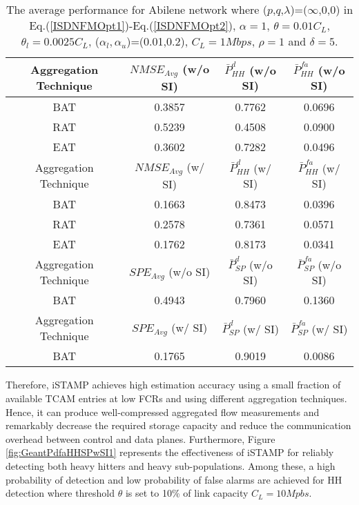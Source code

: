 \begin{table}
	\centering
 \scriptsize{
 \renewcommand{\tabcolsep}{0.05cm}
 \renewcommand{\arraystretch}{1.0}
		\begin{tabular}{| c | c | c | c |}
		\hline
     Aggregation Technique  & $NMSE_{Avg}$ (w/o SI) & $\bar{P}_{HH}^{d}$ (w/o SI) & $\bar{P}_{HH}^{fa}$ (w/o SI) \\ \hline
    \hline
      BAT &  0.3857  &  0.7762  &  0.0696  \\ \hline
      RAT &  0.5239  &  0.4508  &  0.0900  \\ \hline
      EAT &  0.3602  &  0.7282  &  0.0496  \\ \hline
		\hline
     Aggregation Technique  & $NMSE_{Avg}$ (w/ SI) & $\bar{P}_{HH}^{d}$ (w/ SI) &  $\bar{P}_{HH}^{fa}$ (w/ SI) \\ \hline
    \hline
      BAT &  0.1663 &  0.8473  &  0.0396   \\ \hline
      RAT &  0.2578 &  0.7361  &  0.0571   \\ \hline
      EAT &  0.1762 &  0.8173  &  0.0341   \\ \hline
		\hline
     Aggregation Technique  & $SPE_{Avg}$ (w/o SI) & $\bar{P}_{SP}^{d}$ (w/o SI) & $\bar{P}_{SP}^{fa}$ (w/o SI) \\ \hline
    \hline
      BAT &  0.4943  &  0.7960  &  0.1360  \\ \hline
		\hline
     Aggregation Technique  & $SPE_{Avg}$ (w/ SI) & $\bar{P}_{SP}^{d}$ (w/ SI) &  $\bar{P}_{SP}^{fa}$ (w/ SI) \\ \hline
    \hline
      BAT &  0.1765 &   0.9019  &  0.0086   \\ \hline
    \end{tabular}
	\caption{\footnotesize{The average performance for Abilene network where ($p$,$q$,$\lambda$)=($\infty$,0,0) in Eq.(\ref{ISDNFMOpt1})-Eq.(\ref{ISDNFMOpt2}), $\alpha=1$, $\theta=0.01C_{L}$, $\theta_{l}=0.0025C_{L}$, ($\alpha_{l},\alpha_{u}$)=(0.01,0.2), $C_{L}=1 Mbps$, $\rho=1$ and $\delta=5$.}}
	\label{tab:AvgPerfAbilene}
}
\end{table}

Therefore, iSTAMP achieves high estimation accuracy using a small fraction of available TCAM entries at low FCRs and using different aggregation techniques. Hence, it can produce well-compressed aggregated flow measurements and remarkably decrease the required storage capacity and reduce the communication overhead between control and data planes. Furthermore, Figure \ref{fig:GeantPdfaHHSPwSI1} represents the effectiveness of iSTAMP for reliably detecting both heavy hitters and heavy sub-populations. Among these, a high probability of detection and low probability of false alarms are achieved for HH detection where threshold $\theta$ is set to 10\% of link capacity $C_{L} = 10 Mpbs$. 

